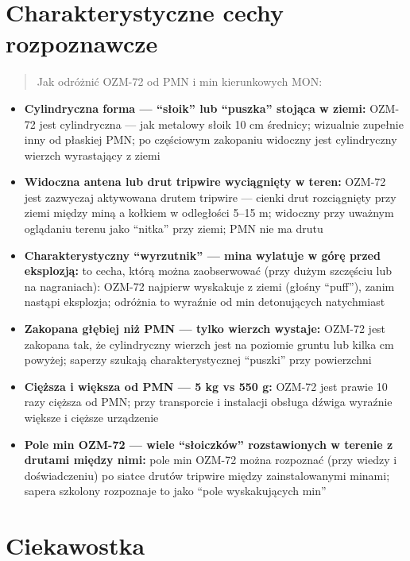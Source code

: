 \documentclass[12pt,openany,oneside]{book}
\providecommand{\tightlist}{%
  \setlength{\itemsep}{0pt}\setlength{\parskip}{0pt}}
\begin{document}
\section{Charakterystyczne cechy
rozpoznawcze}\label{charakterystyczne-cechy-rozpoznawcze-109}

\begin{quote}
Jak odróżnić OZM-72 od PMN i min kierunkowych MON:
\end{quote}

\begin{itemize}
\tightlist
\item
  \textbf{Cylindryczna forma --- ``słoik'' lub ``puszka'' stojąca w
  ziemi:} OZM-72 jest cylindryczna --- jak metalowy słoik 10 cm
  średnicy; wizualnie zupełnie inny od płaskiej PMN; po częściowym
  zakopaniu widoczny jest cylindryczny wierzch wyrastający z ziemi
\item
  \textbf{Widoczna antena lub drut tripwire wyciągnięty w teren:} OZM-72
  jest zazwyczaj aktywowana drutem tripwire --- cienki drut rozciągnięty
  przy ziemi między miną a kołkiem w odległości 5--15 m; widoczny przy
  uważnym oglądaniu terenu jako ``nitka'' przy ziemi; PMN nie ma drutu
\item
  \textbf{Charakterystyczny ``wyrzutnik'' --- mina wylatuje w górę przed
  eksplozją:} to cecha, którą można zaobserwować (przy dużym szczęściu
  lub na nagraniach): OZM-72 najpierw wyskakuje z ziemi (głośny
  ``puff''), zanim nastąpi eksplozja; odróżnia to wyraźnie od min
  detonujących natychmiast
\item
  \textbf{Zakopana głębiej niż PMN --- tylko wierzch wystaje:} OZM-72
  jest zakopana tak, że cylindryczny wierzch jest na poziomie gruntu lub
  kilka cm powyżej; saperzy szukają charakterystycznej ``puszki'' przy
  powierzchni
\item
  \textbf{Cięższa i większa od PMN --- 5 kg vs 550 g:} OZM-72 jest
  prawie 10 razy cięższa od PMN; przy transporcie i instalacji obsługa
  dźwiga wyraźnie większe i cięższe urządzenie
\item
  \textbf{Pole min OZM-72 --- wiele ``słoiczków'' rozstawionych w
  terenie z drutami między nimi:} pole min OZM-72 można rozpoznać (przy
  wiedzy i doświadczeniu) po siatce drutów tripwire między
  zainstalowanymi minami; sapera szkolony rozpoznaje to jako ``pole
  wyskakujących min''
\end{itemize}

\section{Ciekawostka}\label{ciekawostka-109}
\end{document}
